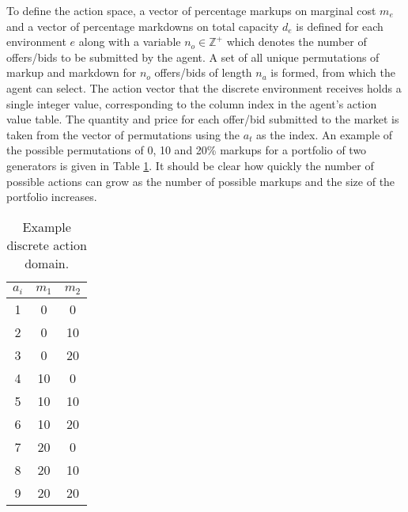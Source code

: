 To define the action space, a vector of percentage markups on marginal cost
$m_e$ and a vector of percentage markdowns on total capacity $d_e$ is defined
for each environment $e$ along with a variable $n_o \in \mathbb{Z}^+$ which
denotes the number of offers/bids to be submitted by the agent.  A set of all
unique permutations of markup and markdown for $n_o$ offers/bids of length
$n_a$ is formed, from which the agent can select.  The action vector that the
discrete environment receives holds a single integer value, corresponding to
the column index in the agent's action value table.  The quantity and price for
each offer/bid submitted to the market is taken from the vector of permutations
using the $a_t$ as the index.  An example of the possible permutations of 0,
10 and 20\% markups for a portfolio of two generators is given in Table
\ref{tbl:example_actions}.  It should be clear how quickly the number of
possible actions can grow as the number of possible markups and the size of the
portfolio increases.

\begin{table}
\begin{center}
\begin{tabular}{c|c|c}
\hline
$a_i$ &$m_1$ &$m_2$ \\
\hline\hline
 1 &0 &0 \\
 2 &0 &10 \\
 3 &0 &20 \\
 4 &10 &0 \\
 5 &10 &10 \\
 6 &10 &20 \\
 7 &20 &0 \\
 8 &20 &10 \\
 9 &20 &20 \\
\hline
\end{tabular}
\caption{Example discrete action domain.}
\label{tbl:example_actions}
\end{center}
\end{table}

